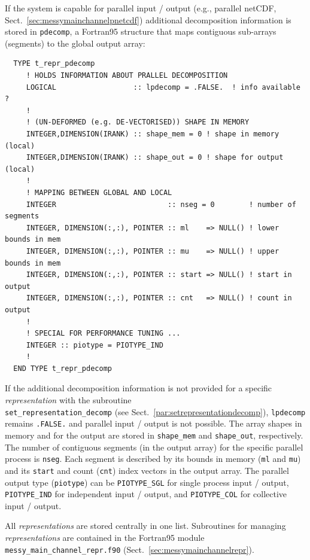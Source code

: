 \documentclass[twoside]{article}
\begin{document}
If the system is capable for parallel input / output
(e.g., parallel netCDF,
Sect.~\ref{sec:messymainchannelpnetcdf})
additional decomposition information is stored in {\tt pdecomp}, a Fortran95
structure that maps contiguous sub-arrays (segments) to the global output array:

\begin{verbatim}
  TYPE t_repr_pdecomp
     ! HOLDS INFORMATION ABOUT PRALLEL DECOMPOSITION
     LOGICAL                  :: lpdecomp = .FALSE.  ! info available ?
     !
     ! (UN-DEFORMED (e.g. DE-VECTORISED)) SHAPE IN MEMORY
     INTEGER,DIMENSION(IRANK) :: shape_mem = 0 ! shape in memory (local)
     INTEGER,DIMENSION(IRANK) :: shape_out = 0 ! shape for output (local)
     !
     ! MAPPING BETWEEN GLOBAL AND LOCAL
     INTEGER                          :: nseg = 0        ! number of segments
     INTEGER, DIMENSION(:,:), POINTER :: ml    => NULL() ! lower bounds in mem
     INTEGER, DIMENSION(:,:), POINTER :: mu    => NULL() ! upper bounds in mem
     INTEGER, DIMENSION(:,:), POINTER :: start => NULL() ! start in output
     INTEGER, DIMENSION(:,:), POINTER :: cnt   => NULL() ! count in output
     !
     ! SPECIAL FOR PERFORMANCE TUNING ...
     INTEGER :: piotype = PIOTYPE_IND
     !
  END TYPE t_repr_pdecomp
\end{verbatim}

If the additional decomposition information is not provided for a specific
{\it representation} with the subroutine\\
{\tt set\_representation\_decomp}
(see Sect.~\ref{par:setrepresentationdecomp}),
{\tt lpdecomp} remains {\tt .FALSE.} and parallel input / output is not
possible.
The array shapes in memory and for the output
are stored in {\tt shape\_mem} and {\tt shape\_out}, respectively.
The number of contiguous segments (in the output array)
for the specific parallel process is {\tt nseg}. Each segment is described
by its bounds in memory ({\tt ml} and {\tt mu}) and its {\tt start} and
count ({\tt cnt}) index vectors in the output array.
The parallel output type ({\tt piotype}) can be
{\tt PIOTYPE\_SGL} for single process input / output,
{\tt PIOTYPE\_IND} for independent input / output, and
{\tt PIOTYPE\_COL} for collective input / output.

All {\it representations} are stored centrally in one list.
Subroutines for managing {\it representations} are contained in the Fortran95
module {\tt messy\_main\_channel\_repr.f90}
(Sect.~\ref{sec:messymainchannelrepr}).
\end{document}
